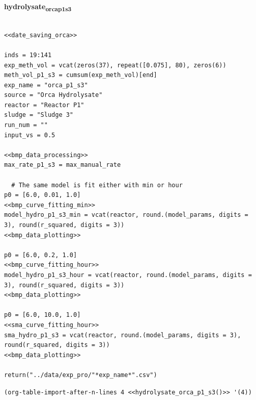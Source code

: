 \documentclass[11pt]{article}
\begin{document}
\textbf{hydrolysate\textsubscript{orca}\textsubscript{p1}\textsubscript{s3}}
\begin{verbatim}

<<date_saving_orca>>

inds = 19:141
exp_meth_vol = vcat(zeros(37), repeat([0.075], 80), zeros(6))
meth_vol_p1_s3 = cumsum(exp_meth_vol)[end]
exp_name = "orca_p1_s3"
source = "Orca Hydrolysate"
reactor = "Reactor P1"
sludge = "Sludge 3"
run_num = ""
input_vs = 0.5

<<bmp_data_processing>>
max_rate_p1_s3 = max_manual_rate

  # The same model is fit either with min or hour
p0 = [6.0, 0.01, 1.0]
<<bmp_curve_fitting_min>>
model_hydro_p1_s3_min = vcat(reactor, round.(model_params, digits = 3), round(r_squared, digits = 3))
<<bmp_data_plotting>>

p0 = [6.0, 0.2, 1.0]
<<bmp_curve_fitting_hour>>
model_hydro_p1_s3_hour = vcat(reactor, round.(model_params, digits = 3), round(r_squared, digits = 3))
<<bmp_data_plotting>>

p0 = [6.0, 10.0, 1.0]
<<sma_curve_fitting_hour>>
sma_hydro_p1_s3 = vcat(reactor, round.(model_params, digits = 3), round(r_squared, digits = 3))
<<bmp_data_plotting>>

return("../data/exp_pro/"*exp_name*".csv")

\end{verbatim}

\begin{verbatim}
(org-table-import-after-n-lines 4 <<hydrolysate_orca_p1_s3()>> '(4))
\end{verbatim}
\end{document}
